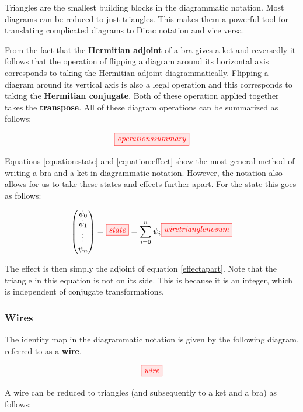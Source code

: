 \documentclass[]{article}
\begin{document}
Triangles are the smallest building blocks in the diagrammatic notation. Most diagrams can be reduced to just triangles. This makes them a powerful tool for translating complicated diagrams to Dirac notation and vice versa.

From the fact that the \textbf{Hermitian adjoint} of a bra gives a ket and reversedly it follows that the operation of flipping a diagram around its horizontal axis corresponds to taking the Hermitian adjoint diagrammatically. Flipping a diagram around its vertical axis is also a legal operation and this corresponds to taking the \textbf{Hermitian conjugate}. Both of these operation applied together takes the \textbf{transpose}. All of these diagram operations can be summarized as follows:

\begin{equation}
\tikzfig{operationssummary}
\end{equation}

Equations \ref{equation:state} and \ref{equation:effect} show the most general method of writing a bra and a ket in diagrammatic notation. However, the notation also allows for us to take these states and effects further apart. For the state this goes as follows: 

\begin{equation}
\label{effectapart}
\begin{pmatrix}
\psi_0 \\
\psi_1 \\
\vdots \\
\psi_n
\end{pmatrix} = \tikzfig{state} = \sum\limits_{i=0}^{n} \psi_i \tikzfig{wiretrianglenosum}
\end{equation}

The effect is then simply the adjoint of equation \ref{effectapart}. Note that the triangle in this equation is not on its side. This is because it is an integer, which is independent of conjugate transformations. 

\subsubsection{Wires}
\label{identity}
The identity map in the diagrammatic notation is given by the following diagram, referred to as a \textbf{wire}.

\begin{equation}
\tikzfig{wire}
\end{equation}

A wire can be reduced to triangles (and subsequently to a ket and a bra) as follows: 
\end{document}
